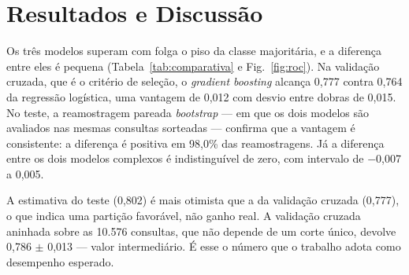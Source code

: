 \documentclass[conference]{IEEEtran}
\begin{document}
\section{Resultados e Discussão}
\begin{table}[!t]
\caption{Desempenho no cenário com 37 atributos. A coluna de validação cruzada traz a média e o desvio-padrão das cinco dobras do treino; as demais referem-se ao conjunto de teste (2.116 consultas), com intervalos de 95\% por reamostragem \textit{bootstrap}. Sensibilidade, especificidade e F1 usam o limiar fixado no treino.}
\label{tab:comparativa}
\centering
\footnotesize
\setlength{\tabcolsep}{3pt}
\end{table}

Os três modelos superam com folga o piso da classe majoritária, e a diferença entre eles é pequena (Tabela~\ref{tab:comparativa} e Fig.~\ref{fig:roc}). Na validação cruzada, que é o critério de seleção, o \textit{gradient boosting} alcança 0,777 contra 0,764 da regressão logística, uma vantagem de 0,012 com desvio entre dobras de 0,015. No teste, a reamostragem pareada \textit{bootstrap} \cite{efron} --- em que os dois modelos são avaliados nas mesmas consultas sorteadas --- confirma que a vantagem é consistente: a diferença é positiva em 98,0\% das reamostragens. Já a diferença entre os dois modelos complexos é indistinguível de zero, com intervalo de $-$0,007 a 0,005.

A estimativa do teste (0,802) é mais otimista que a da validação cruzada (0,777), o que indica uma partição favorável, não ganho real. A validação cruzada aninhada sobre as 10.576 consultas, que não depende de um corte único, devolve 0,786 $\pm$ 0,013 --- valor intermediário. É esse o número que o trabalho adota como desempenho esperado.
\end{document}
